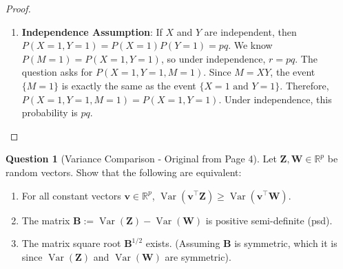 \documentclass[11pt, a4paper]{article}
\DeclareMathOperator{\Var}{\mathrm{Var}}         %
\theoremstyle{definition}
\newtheorem{question}[theorem]{Question} %
\theoremstyle{remark}
\newcommand{\RR}{\mathbb{R}}             %
\newcommand{\mat}[1]{\mathbf{#1}}       %
\newcommand{\vect}[1]{\bm{#1}}          %
\newcommand{\transpose}{^{\top}}        %
\begin{document}
\begin{proof}
\begin{enumerate}[label=(\alph*)]
    \item \textbf{Independence Assumption}:
    If $X$ and $Y$ are independent, then $P(X=1, Y=1) = P(X=1)P(Y=1) = pq$.
    We know $P(M=1) = P(X=1, Y=1)$, so under independence, $r = pq$.
    The question asks for $P(X=1, Y=1, M=1)$.
    Since $M=XY$, the event $\{M=1\}$ is exactly the same as the event $\{X=1 \text{ and } Y=1\}$.
    Therefore, $P(X=1, Y=1, M=1) = P(X=1, Y=1)$.
    Under independence, this probability is $pq$.
\end{enumerate}
\end{proof}

\begin{question}[Variance Comparison - Original from Page 4]
Let $\vect{Z}, \vect{W} \in \RR^p$ be random vectors. Show that the following are equivalent:
\begin{enumerate}
    \item For all constant vectors $\vect{v} \in \RR^p$, $\Var(\vect{v}\transpose \vect{Z}) \geq \Var(\vect{v}\transpose \vect{W})$.
    \item The matrix $\mat{B} := \Var(\vect{Z}) - \Var(\vect{W})$ is positive semi-definite (psd).
    \item The matrix square root $\mat{B}^{1/2}$ exists. (Assuming $\mat{B}$ is symmetric, which it is since $\Var(\vect{Z})$ and $\Var(\vect{W})$ are symmetric).
\end{enumerate}
\end{question}
\end{document}
